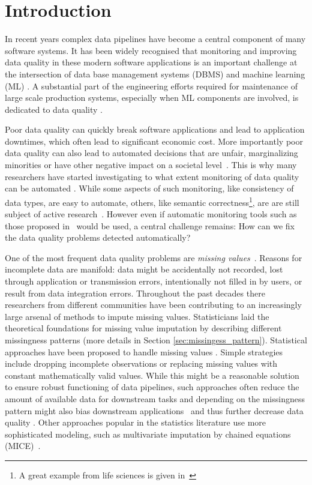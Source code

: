 \section{Introduction}
\label{sec:introduction}

In recent years complex data pipelines have become a central component of many software systems. It has been widely recognised that monitoring and improving data quality in these modern software applications is an important challenge at the intersection of data base management systems (DBMS) and machine learning (ML) \citep{Schelter2015,Abedjan2018}. A substantial part of the engineering efforts required for maintenance of large scale production systems, especially when ML components are involved, is dedicated to data quality \citep{Sculley2015,Bose2017b}.

Poor data quality can quickly break software applications and lead to application downtimes, which often lead to significant economic cost. More importantly poor data quality can also lead to automated decisions that are unfair, marginalizing minorities or have other negative impact on a societal level~\citep{Stoyanovich2020,Yang2020,Bender2021}. This is why many researchers have started investigating to what extent monitoring of data quality can be automated \citep{Abedjan2016,Baylor2017,Schelter2018,rukat2020towards}. While some aspects of such monitoring, like consistency of data types, are easy to automate, others, like semantic correctness\footnote{A great example from life sciences is given in~\citep{Ziemann2016}}, are are still subject of active research~\citep{biessmann2021automated}. However even if automatic monitoring tools such as those proposed in~\citep{Schelter2017} would be used, a central challenge remains: How can we fix the data quality problems detected automatically?

One of the most frequent data quality problems are \emph{missing values}~\citep{Kumar}. Reasons for incomplete data are manifold: data might be accidentally not recorded, lost through application or transmission errors, intentionally not filled in by users, or result from data integration errors.
%
Throughout the past decades there researchers from different communities have been contributing to an increasingly large arsenal of methods to impute missing values. Statisticians laid the theoretical foundations for missing value imputation \citep{Rubin} by describing different missingness patterns (more details in Section \ref{sec:missingess_pattern}). Statistical approaches have been proposed to handle missing values \citep{Graham}. Simple strategies include dropping incomplete observations or replacing missing values with constant mathematically valid values. While this might be a reasonable solution to ensure robust functioning of data pipelines, such approaches often reduce the amount of available data for downstream tasks and depending on the missingness pattern might also bias downstream applications~\citep{Stoyanovich2020,Yang2020} and thus further decrease data quality \citep{Little, Graham}. Other approaches popular in the statistics literature use more sophisticated modeling, such as multivariate imputation by chained equations (MICE)~\citep{Little,vanBuuren2018}.

